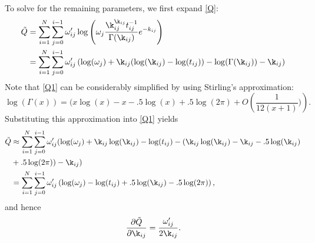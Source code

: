 \documentclass[12pt,leqno]{article}
\begin{document}
To solve for the remaining parameters, we first expand \eqref{Q}:
\begin{equation}\label{Q1}
  \begin{split}
    \tilde{Q} &= \sum_{i=1}^N\sum_{j=0}^{i-1}\omega'_{ij}\log\left(\omega_j\frac{\k_{ij}^{\k_{ij}}t_{ij}^{-1}}
          {\Gamma(\k_{ij})}e^{-k_{ij}} \right)\\
    &= \sum_{i=1}^N\sum_{j=0}^{i-1}\omega'_{ij}\left(\log(\omega_j)+\k_{ij}(\log(\k_{ij}) - \log(t_{ij})) 
          -\log(\Gamma(\k_{ij})) -\k_{ij}\right)\\
  \end{split}
\end{equation}
Note that \eqref{Q1} can be considerably simplified by using Stirling's approximation:
\begin{equation}\label{stirling}
  \log(\Gamma(x)) =  (x\log(x) -x - .5\log(x) + .5\log(2\pi) + O\left(\frac{1}{12(x+1)})\right).%
\end{equation}
Substituting this approximation into \eqref{Q1} yields
\begin{equation}\label{Q2}
  \begin{split}
    \tilde{Q} &\approx \sum_{i=1}^N\sum_{j=0}^{i-1}\omega'_{ij}(\log(\omega_j)+\k_{ij}\log(\k_{ij}) - \log(t_{ij})
    -(\k_{ij}\log(\k_{ij}) -\k_{ij} -.5\log(\k_{ij}) \\
    &+ .5\log(2\pi)) -\k_{ij})\\
  &= \sum_{i=1}^N\sum_{j=0}^{i-1}\omega'_{ij}\left(\log(\omega_j) - \log(t_{ij}) + .5\log(\k_{ij})
  - .5\log(2\pi) \right),
  \end{split}
\end{equation}
and hence
\begin{equation}
  \frac{\partial\tilde{Q}}{\partial\k_{ij}} = \frac{\omega'_{ij}}{2\k_{ij}}.
\end{equation}
\end{document}
